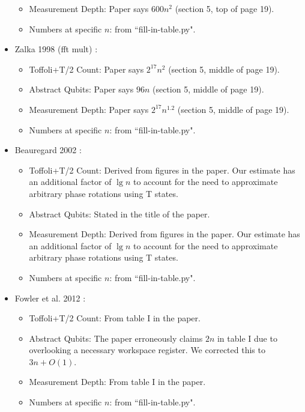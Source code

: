 \documentclass[a4paper, onecolumn, accepted=2021-03-29]{quantumarticle}
\begin{document}
\begin{itemize}
\begin{itemize}
        \item Measurement Depth:
            Paper says $600n^2$ (section 5, top of page 19).
        \item Numbers at specific $n$: from ``fill-in-table.py".
    \end{itemize}
    \item Zalka 1998 (fft mult) \cite{zalka1998fast}:
    \begin{itemize}
        \item Toffoli+T/2 Count:
            Paper says $2^{17}n^2$ (section 5, middle of page 19).
        \item Abstract Qubits:
            Paper says $96n$ (section 5, middle of page 19).
        \item Measurement Depth:
            Paper says $2^{17}n^{1.2}$ (section 5, middle of page 19).
        \item Numbers at specific $n$: from ``fill-in-table.py".
    \end{itemize}
    \item Beauregard 2002 \cite{beauregard2002shor}:
    \begin{itemize}
        \item Toffoli+T/2 Count: Derived from figures in the paper. Our estimate has an additional factor of $\lg n$ to account for the need to approximate arbitrary phase rotations using T states.
        \item Abstract Qubits: Stated in the title of the paper.
        \item Measurement Depth: Derived from figures in the paper. Our estimate has an additional factor of $\lg n$ to account for the need to approximate arbitrary phase rotations using T states.
        \item Numbers at specific $n$: from ``fill-in-table.py".
    \end{itemize}
    \item Fowler et al. 2012 \cite{fowler2012surfacecodereview}:
    \begin{itemize}
        \item Toffoli+T/2 Count: From table I in the paper.
        \item Abstract Qubits: The paper erroneously claims $2n$ in table I due to overlooking a necessary workspace register.
        We corrected this to $3n + O(1)$.
        \item Measurement Depth: From table I in the paper.
        \item Numbers at specific $n$: from ``fill-in-table.py".

\end{itemize}
\end{itemize}
\end{document}
